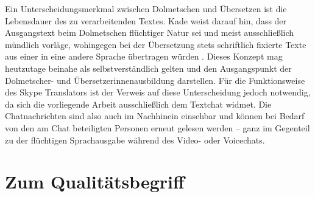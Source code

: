 \begin{sloppypar}
Ein Unterscheidungsmerkmal zwischen Dolmetschen und Übersetzen ist die Lebensdauer des zu verarbeitenden Textes. Kade weist darauf hin, dass der Ausgangstext beim Dolmetschen flüchtiger Natur sei und meist ausschließlich mündlich vorläge, wohingegen bei der Übersetzung stets schriftlich fixierte Texte aus einer in eine andere Sprache übertragen würden  \citep[34]{kade_zufall_1968}. Dieses Konzept mag heutzutage beinahe als selbstverständlich gelten und den Ausgangspunkt der Dolmetscher- und Übersetzer{\textperiodcentered}innenausbildung darstellen. Für die Funktionsweise des Skype Translators ist der Verweis auf diese Unterscheidung jedoch notwendig, da sich die vorliegende Arbeit ausschließlich dem Textchat widmet. Die Chatnachrichten sind also auch im Nachhinein einsehbar und können bei Bedarf von den am Chat beteiligten Personen erneut gelesen werden -- ganz im Gegenteil zu der flüchtigen Sprachausgabe während des Video- oder Voicechats.
\end{sloppypar}  



%
%
%


\section{Zum Qualitätsbegriff}
\label{K3:sec:Qualitaet}


